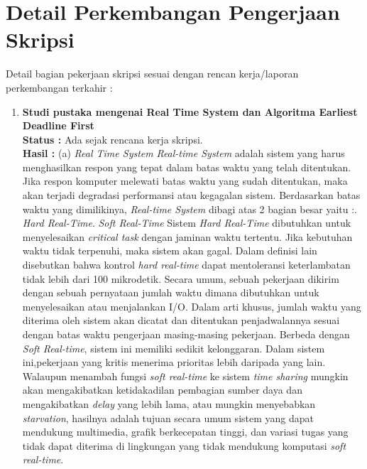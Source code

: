 \documentclass[a4paper,twoside]{article}
\begin{document}
\section{Detail Perkembangan Pengerjaan Skripsi}
Detail bagian pekerjaan skripsi sesuai dengan rencan kerja/laporan perkembangan terkahir :
	\begin{enumerate}
		\item \textbf{Studi pustaka mengenai Real Time System dan Algoritma Earliest Deadline First}\\
		{\bf Status :} Ada sejak rencana kerja skripsi.\\
		{\bf Hasil : \newline } 
		(a) {\it Real Time System}\newline
        {\it Real-time System} adalah sistem yang harus menghasilkan respon yang tepat dalam batas waktu yang telah ditentukan. Jika respon komputer melewati batas waktu yang sudah ditentukan, maka akan terjadi degradasi performansi atau kegagalan sistem. Berdasarkan batas waktu yang dimilikinya, {\it Real-time System} dibagi atas 2 bagian besar yaitu :. {\it Hard Real-Time}. {\it Soft Real-Time}\newline\newline
		Sistem {\it Hard Real-Time} dibutuhkan untuk menyelesaikan {\it critical task} dengan jaminan waktu tertentu. Jika kebutuhan waktu tidak terpenuhi, maka sistem akan gagal. Dalam definisi lain disebutkan bahwa kontrol {\it hard real-time} dapat mentoleransi keterlambatan tidak lebih dari 100 mikrodetik. Secara umum, sebuah pekerjaan dikirim dengan sebuah pernyataan jumlah waktu dimana dibutuhkan untuk menyelesaikan atau menjalankan I/O. Dalam arti khusus, jumlah waktu yang diterima oleh sistem akan dicatat dan ditentukan penjadwalannya sesuai dengan batas waktu pengerjaan masing-masing pekerjaan.\newline \newline
		Berbeda dengan {\it Soft Real-time}, sistem ini memiliki sedikit kelonggaran. Dalam sistem ini,pekerjaan yang kritis menerima prioritas lebih daripada yang lain. Walaupun menambah fungsi {\it soft real-time} ke sistem {\it time sharing} mungkin akan mengakibatkan ketidakadilan pembagian sumber daya dan mengakibatkan {\it delay} yang lebih lama, atau mungkin menyebabkan {\it starvation}, hasilnya adalah tujuan secara umum sistem yang dapat mendukung multimedia, grafik berkecepatan tinggi, dan variasi tugas yang tidak dapat diterima di lingkungan yang tidak mendukung komputasi {\it soft real-time}.
		\newline \newline \newpage
		

\end{enumerate}
\end{document}
